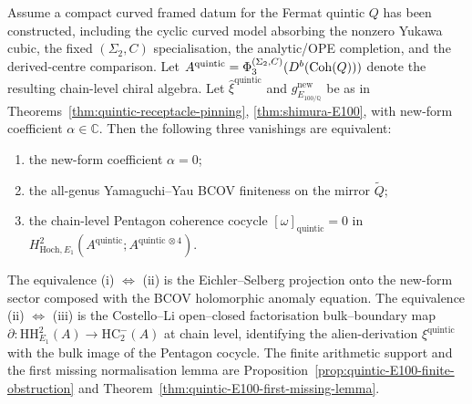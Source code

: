 \begin{theorem}
\label{thm:quintic-E100-pentagon-equivalence}
Assume a compact curved framed datum for the Fermat quintic $Q$
has been constructed, including the cyclic curved model absorbing the
nonzero Yukawa cubic, the fixed $(\Sigma_2,C)$ specialisation, the
analytic/OPE completion, and the derived-centre comparison. Let
$A^{\mathrm{quintic}}=\Phi_3^{(\Sigma_2,C)}(D^b(\mathrm{Coh}(Q)))$ denote the
resulting chain-level chiral algebra. Let
$\widehat{\xi}^{\mathrm{quintic}}$ and $g^{\mathrm{new}}_{E_{100/\mathbb{Q}}}$
be as in
Theorems~\ref{thm:quintic-receptacle-pinning},
\ref{thm:shimura-E100}, with new-form coefficient $\alpha \in \mathbb{C}$.
Then the following three vanishings are equivalent:
\begin{enumerate}[label=\textup{(\roman*)}]
\item the new-form coefficient $\alpha = 0$;
\item the all-genus Yamaguchi--Yau BCOV finiteness on the mirror
 $\widetilde{Q}$;
\item the chain-level Pentagon coherence cocycle
 $[\omega]_{\mathrm{quintic}} = 0$ in
 $H^2_{\mathrm{Hoch}, E_1}(A^{\mathrm{quintic}};
 A^{\mathrm{quintic}\,\otimes 4})$.
\end{enumerate}
The equivalence \textup{(i) $\Leftrightarrow$ (ii)} is the Eichler--Selberg
projection onto the new-form sector composed with the BCOV holomorphic
anomaly equation. The equivalence \textup{(ii) $\Leftrightarrow$ (iii)}
is the Costello--Li open--closed factorisation bulk--boundary map
$\partial: \mathrm{HH}^2_{E_1}(A) \to \mathrm{HC}_2^-(A)$ at chain level,
identifying the alien-derivation $\xi^{\mathrm{quintic}}$ with the bulk
image of the Pentagon cocycle.
The finite arithmetic support and the first missing normalisation lemma
are Proposition~\ref{prop:quintic-E100-finite-obstruction}
and Theorem~\ref{thm:quintic-E100-first-missing-lemma}.


\end{theorem}
